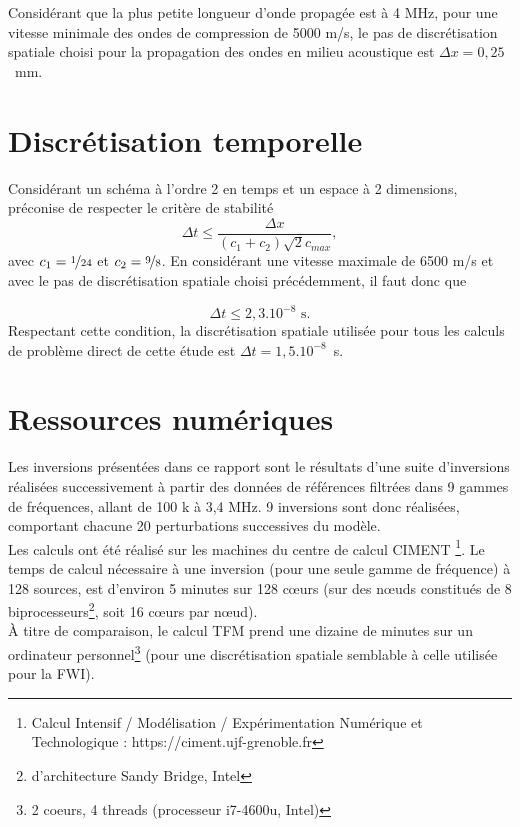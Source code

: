 Considérant que la plus petite longueur d'onde propagée est à 4 MHz, pour une vitesse minimale des ondes de compression de 5000 m/s, le pas de discrétisation spatiale choisi pour la propagation des ondes en milieu acoustique est $\Delta x=0,25$~mm.

\section*{Discrétisation temporelle}

Considérant un schéma à l'ordre 2 en temps et un espace à 2 dimensions, \cite{levander} préconise de respecter le critère de stabilité  
\begin{equation}
	\Delta t \leq \frac{\Delta x}{(c_{1}+c_{2})\sqrt{2} c_{max}},
\end{equation}
avec $c_{1}=\nicefrac{1}{24}$ et $c_{2}=\nicefrac{9}{8}$. En considérant une vitesse maximale de 6500 m/s et avec le pas de discrétisation spatiale choisi précédemment, il faut donc que 

\begin{equation}
	\Delta t \leq 2,3.10^{-8} \text{~s.}
\end{equation}
Respectant cette condition, la discrétisation spatiale utilisée pour tous les calculs de problème direct de cette étude est $\Delta t=1,5.10^{-8}$~s.



\section*{Ressources numériques}

Les inversions présentées dans ce rapport sont le résultats d'une suite d'inversions réalisées successivement à partir des données de références filtrées dans 9 gammes de fréquences, allant de 100 k à 3,4 MHz. 9 inversions sont donc réalisées, comportant chacune 20 perturbations successives du modèle.\\

Les calculs ont été réalisé sur les machines du centre de calcul CIMENT \footnote{Calcul Intensif / Modélisation / Expérimentation Numérique et Technologique : https://ciment.ujf-grenoble.fr}. Le temps de calcul nécessaire à une inversion (pour une seule gamme de fréquence) à 128 sources, est d'environ 5 minutes sur 128 cœurs  (sur des nœuds constitués de 8 biprocesseurs\footnote{d'architecture Sandy Bridge, Intel}, soit 16 cœurs par nœud).\\

 À titre de comparaison,  le calcul TFM prend une dizaine de minutes sur un ordinateur personnel\footnote{2 coeurs, 4 threads (processeur i7-4600u, Intel)} (pour une discrétisation spatiale semblable à celle utilisée pour la FWI).



